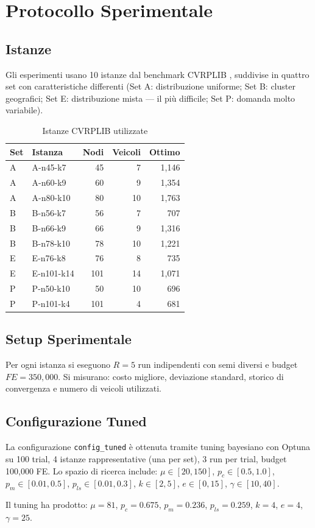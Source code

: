\section{Protocollo Sperimentale}

\subsection{Istanze}

Gli esperimenti usano 10 istanze dal benchmark CVRPLIB \cite{cvrplib}, suddivise in
quattro set con caratteristiche differenti (Set A: distribuzione uniforme;
Set B: cluster geografici; Set E: distribuzione mista --- il pi\`u difficile;
Set P: domanda molto variabile).

\begin{table}[H]
\centering
\caption{Istanze CVRPLIB utilizzate}
\label{tab:instances}
\footnotesize
\begin{tabular}{@{}llrrr@{}}
\toprule
\textbf{Set} & \textbf{Istanza} & \textbf{Nodi} & \textbf{Veicoli} & \textbf{Ottimo} \\
\midrule
A & A-n45-k7  & 45  &  7 & 1{,}146 \\
A & A-n60-k9  & 60  &  9 & 1{,}354 \\
A & A-n80-k10 & 80  & 10 & 1{,}763 \\
B & B-n56-k7  & 56  &  7 &   707 \\
B & B-n66-k9  & 66  &  9 & 1{,}316 \\
B & B-n78-k10 & 78  & 10 & 1{,}221 \\
E & E-n76-k8  & 76  &  8 &   735 \\
E & E-n101-k14& 101 & 14 & 1{,}071 \\
P & P-n50-k10 & 50  & 10 &   696 \\
P & P-n101-k4 & 101 &  4 &   681 \\
\bottomrule
\end{tabular}
\end{table}

\subsection{Setup Sperimentale}

Per ogni istanza si eseguono $R = 5$ run indipendenti con semi diversi e budget
$FE = 350{,}000$. Si misurano: costo migliore, deviazione standard, storico di
convergenza e numero di veicoli utilizzati.

\subsection{Configurazione Tuned}

La configurazione \texttt{config\_tuned} \`e ottenuta tramite tuning bayesiano con
Optuna \cite{akiba2019optuna} su 100 trial, 4 istanze rappresentative (una per set),
3 run per trial, budget 100{,}000 FE. Lo spazio di ricerca include:
$\mu \in [20,150]$, $p_c \in [0.5,1.0]$, $p_m \in [0.01,0.5]$,
$p_{ls} \in [0.01,0.3]$, $k \in [2,5]$, $e \in [0,15]$, $\gamma \in [10,40]$.

Il tuning ha prodotto: $\mu=81$, $p_c=0.675$, $p_m=0.236$, $p_{ls}=0.259$,
$k=4$, $e=4$, $\gamma=25$.
